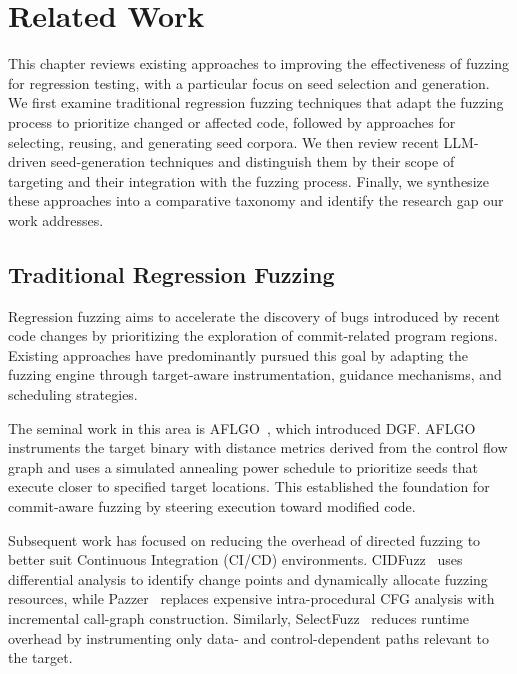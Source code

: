 \chapter{Related Work}
\label{chapter:related-work}

This chapter reviews existing approaches to improving the effectiveness of
fuzzing for regression testing, with a particular focus on seed selection and
generation. We first examine traditional regression fuzzing techniques that
adapt the fuzzing process to prioritize changed or affected code, followed by
approaches for selecting, reusing, and generating seed corpora. We then review
recent LLM-driven seed-generation techniques and distinguish them by their scope
of targeting and their integration with the fuzzing process. Finally, we
synthesize these approaches into a comparative taxonomy and identify the
research gap our work addresses.

\section{Traditional Regression Fuzzing}
\label{sec:rw-regression-fuzzing}

Regression fuzzing aims to accelerate the discovery of bugs introduced by recent
code changes by prioritizing the exploration of commit-related program regions.
Existing approaches have predominantly pursued this goal by adapting the fuzzing
engine through target-aware instrumentation, guidance mechanisms, and scheduling
strategies.

The seminal work in this area is AFLGO~\cite{bohmeDirectedGreyboxFuzzing2017},
which introduced \ac{DGF}. AFLGO instruments the target binary with distance
metrics derived from the control flow graph and uses a simulated annealing power
schedule to prioritize seeds that execute closer to specified target locations.
This established the foundation for commit-aware fuzzing by steering execution
toward modified code.

Subsequent work has focused on reducing the overhead of directed fuzzing to
better suit Continuous Integration (CI/CD) environments.
CIDFuzz~\cite{zhangCIDFuzzFuzzTesting2023} uses differential analysis to
identify change points and dynamically allocate fuzzing resources, while
Pazzer~\cite{sharmaEffectiveFuzzingCI2024a} replaces expensive intra-procedural
CFG analysis with incremental call-graph construction. Similarly,
SelectFuzz~\cite{luoSelectFuzzEfficientDirected2023} reduces runtime overhead by
instrumenting only data- and control-dependent paths relevant to the target.

